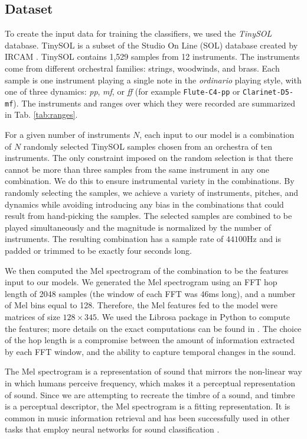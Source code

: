 \documentclass[runningheads,a4paper]{llncs}
\begin{document}
\subsection{Dataset}
\label{sec:dataset}

To create the input data for training the classifiers, we used the \emph{TinySOL} database. TinySOL is a subset of the Studio On Line (SOL) database created by IRCAM \cite{Cella2020b}. TinySOL contains 1,529 samples from 12 instruments. The instruments come from different orchestral families: strings, woodwinds, and brass. Each sample is one instrument playing a single note in the \emph{ordinario} playing style, with one of three dynamics: \textit{pp}, \textit{mf}, or \textit{ff} (for example \texttt{Flute-C4-pp} or \texttt{Clarinet-D5-mf}). The instruments and ranges over which they were recorded are summarized in Tab. \ref{tab:ranges}.

For a given number of instruments $N$, each input to our model is a combination of $N$ randomly selected TinySOL samples chosen from an orchestra of ten instruments. The only constraint imposed on the random selection is that there cannot be more than three samples from the same instrument in any one combination. We do this to ensure instrumental variety in the combinations. By randomly selecting the samples, we achieve a variety of instruments, pitches, and dynamics while avoiding introducing any bias in the combinations that could result from hand-picking the samples. The selected samples are combined to be played simultaneously and the magnitude is normalized by the number of instruments. The resulting combination has a sample rate of $44100$Hz and is padded or trimmed to be exactly four seconds long.

We then computed the Mel spectrogram of the combination to be the features input to our models. We generated the Mel spectrogram using an FFT hop length of 2048 samples (the window of each FFT was $46$ms long), and a number of Mel bins equal to 128. Therefore, the Mel features fed to the model were matrices of size $128\times 345$. We used the Librosa package in Python to compute the features; more details on the exact computations can be found in \cite{mcfee15}. The choice of the hop length is a compromise between the amount of information extracted by each FFT window, and the ability to capture temporal changes in the sound.

The Mel spectrogram is a representation of sound that mirrors the non-linear way in which humans perceive frequency, which makes it a perceptual representation of sound. Since we are attempting to recreate the timbre of a sound, and timbre is a perceptual descriptor, the Mel spectrogram is a fitting representation. It is common in music information retrieval \cite{McKinney2003} and has been successfully used in other tasks that employ neural networks for sound classification \cite{Salamon17}.
\end{document}
